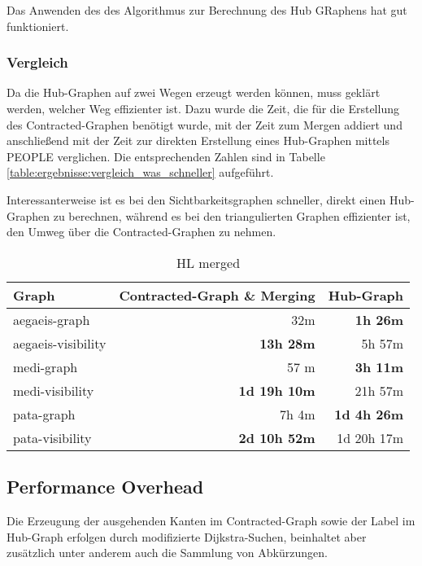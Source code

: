 Das Anwenden des des Algorithmus zur Berechnung des Hub GRaphens hat gut funktioniert.


\subsubsection{Vergleich}


Da die Hub-Graphen auf zwei Wegen erzeugt werden können, muss geklärt werden, welcher Weg effizienter ist.
Dazu wurde die Zeit, die für die Erstellung des Contracted-Graphen benötigt wurde, mit der Zeit zum Mergen addiert und anschließend mit der Zeit zur direkten Erstellung eines Hub-Graphen mittels PEOPLE verglichen.
Die entsprechenden Zahlen sind in Tabelle \autoref{table:ergebnisse:vergleich_was_schneller} aufgeführt.

Interessanterweise ist es bei den Sichtbarkeitsgraphen schneller, direkt einen Hub-Graphen zu berechnen, während es bei den triangulierten Graphen effizienter ist, den Umweg über die Contracted-Graphen zu nehmen.



\begin{table}[h!]
  \centering
  \begin{tabular}{ %
      l %
      r
      r
    }
    \toprule
    {Graph}            & {Contracted-Graph \& Merging} & {Hub-Graph}                    \\
    \midrule
    aegaeis-graph      & 32m                           & \bfseries 1h 26m               \\
    aegaeis-visibility & \bfseries 13h 28m             & 5h 57m                         \\
    medi-graph         & 57 m                          & \bfseries 3h 11m               \\
    medi-visibility    & \bfseries 1d 19h 10m          & 21h 57m                        \\
    pata-graph         & 7h \phantom{0} 4m             & \bfseries 1d \phantom{0}4h 26m \\
    pata-visibility    & \bfseries 2d 10h 52m          & 1d 20h 17m                     \\  \bottomrule
  \end{tabular}
  \caption{HL  merged}
  \label{table:ergebnisse:vergleich_was_schneller}
\end{table}

\subsection{Performance Overhead}
Die Erzeugung der ausgehenden Kanten im Contracted-Graph sowie der Label im Hub-Graph erfolgen durch modifizierte Dijkstra-Suchen, beinhaltet aber zusätzlich unter anderem auch die Sammlung von Abkürzungen.

